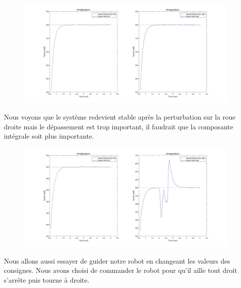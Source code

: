 \documentclass[a4paper]{article}
\begin{document}
		\begin{figure}[h]
			\centering
			\includegraphics[width = 11cm]{imgs/fig8.jpg}
			\caption{}
		\end{figure}
		Nous voyons que le système redevient stable après la perturbation sur la roue droite mais le dépassement est trop important, il faudrait que la composante intégrale soit plus importante.
		
		\begin{figure}[h]
			\centering
			\includegraphics[width = 11cm]{imgs/fig9.jpg}
			\caption{}
		\end{figure}
		Nous allons aussi essayer de guider notre robot en changeant les valeurs des consignes. Nous avons choisi de commander le robot pour qu’il aille tout droit s’arrête puis tourne à droite.
		\newpage
		
\end{document}
